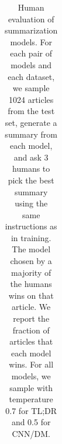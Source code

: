 {\begin{table}[h!]
\begin{tabular}{l|rlr|rlr}












\bottomrule
\end{tabular}
\caption{Human evaluation of summarization models. For each pair of models and each dataset, we sample 1024 articles from the test set, generate a summary from each model, and ask 3 humans to pick the best summary using the same instructions as in training. The model chosen by a majority of the humans wins on that article. We report the fraction of articles that each model wins. For all models, we sample with temperature 0.7 for TL;DR and 0.5 for CNN/DM.
\label{tab:human_evals_summ}}
\end{table}
}